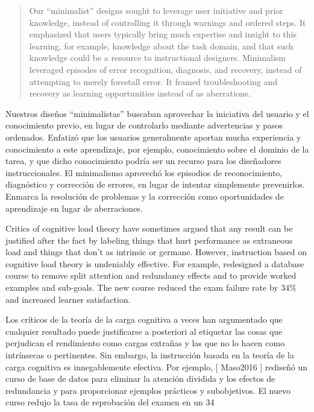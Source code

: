 {\begin{quote}

  Our ``minimalist'' designs sought to leverage user initiative and prior knowledge,
  instead of controlling it through warnings and ordered steps.
  It emphasized that users typically bring much expertise and insight to this learning,
  for example,
  knowledge about the task domain,
  and that such knowledge could be a resource to instructional designers.
  Minimalism leveraged episodes of error recognition, diagnosis, and recovery,
  instead of attempting to merely forestall error.
  It framed troubleshooting and recovery as learning opportunities instead of as aberrations.

\end{quote}

Nuestros diseños “minimalistas” buscaban aprovechar la iniciativa del usuario y el conocimiento previo, en lugar de controlarlo mediante advertencias y pasos ordenados. Enfatizó que los usuarios generalmente aportan mucha experiencia y conocimiento a este aprendizaje, por ejemplo, conocimiento sobre el dominio de la tarea, y que dicho conocimiento podría ser un recurso para los diseñadores instruccionales. El minimalismo aprovechó los episodios de reconocimiento, diagnóstico y corrección de errores, en lugar de intentar simplemente prevenirlos. Enmarca la resolución de problemas y la corrección como oportunidades de aprendizaje en lugar de aberraciones.


Critics of cognitive load theory have sometimes argued that
any result can be justified after the fact by labeling things that hurt performance as extraneous load
and things that don't as intrinsic or germane.
However,
instruction based on cognitive load theory is undeniably effective.
For example,
\cite{Maso2016} redesigned a database course to remove split attention and redundancy effects
and to provide worked examples and sub-goals.
The new course reduced the exam failure rate by 34\%
and increased learner satisfaction.

Los críticos de la teoría de la carga cognitiva a veces han argumentado que cualquier resultado puede justificarse a posteriori al etiquetar las cosas que perjudican el rendimiento como cargas extrañas y las que no lo hacen como intrínsecas o pertinentes. Sin embargo, la instrucción basada en la teoría de la carga cognitiva es innegablemente efectiva. Por ejemplo, [ Maso2016 ] rediseñó un curso de base de datos para eliminar la atención dividida y los efectos de redundancia y para proporcionar ejemplos prácticos y subobjetivos. El nuevo curso redujo la tasa de reprobación del examen en un 34%


}
